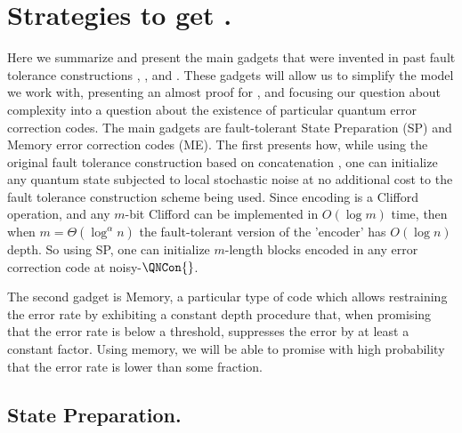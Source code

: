 

  \section{ Strategies to get \CDO. }  \label{sec:opt}
 
Here we summarize and present the main gadgets that were invented in past fault tolerance constructions \cite{aharonov1999faulttolerant}, \cite{gottesman2014faulttolerant}, and \cite{grospellier:tel-03364419}. These gadgets will allow us to simplify the model we work with, presenting an almost proof for \CDO, and focusing our question about complexity into a question about the existence of particular quantum error correction codes. The main gadgets are fault-tolerant State Preparation (SP) and Memory error correction codes (ME). The first presents how, while using the original fault tolerance construction based on concatenation \cite{aharonov1999faulttolerant}, one can initialize any quantum state subjected to local stochastic noise at no additional cost to the fault tolerance construction scheme being used. Since encoding is a Clifford operation, and any $m$-bit Clifford can be implemented in $O(\log m)$ time, then when $m =\Theta(\log^{\alpha} n)$ the fault-tolerant version of the 'encoder' has $O(\log n)$ depth. So using SP, one can initialize $m$-length blocks encoded in any error correction code at noisy-$\QNCon{}$.

The second gadget is Memory, a particular type of code which allows restraining the error rate by exhibiting a constant depth procedure that, when promising that the error rate is below a threshold, suppresses the error by at least a constant factor. Using memory, we will be able to promise with high probability that the error rate is lower than some fraction. 

\subsection{State Preparation.}



